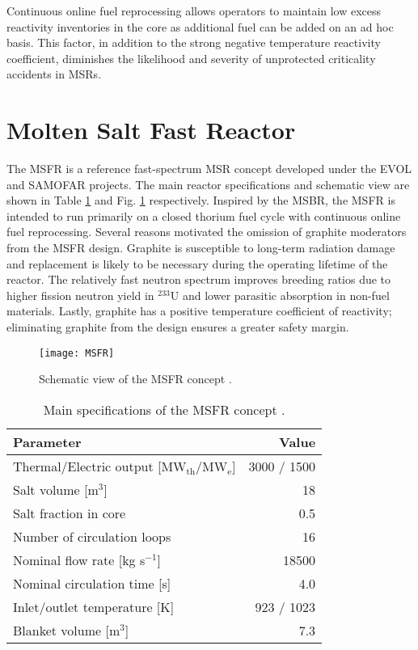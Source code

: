 Continuous online fuel reprocessing allows operators to maintain low excess
reactivity inventories in the core as additional fuel can be added on an ad
hoc basis. This factor, in addition to the strong negative temperature
reactivity coefficient, diminishes the likelihood and severity of unprotected
criticality accidents in \glspl{MSR}. 


\section{Molten Salt Fast Reactor}

The \gls{MSFR} is a reference fast-spectrum \gls{MSR} concept developed
under the \gls{EVOL} and \gls{SAMOFAR} projects. The main reactor
specifications and schematic view are shown in Table \ref{table:msfr} and Fig.
\ref{fig:msfr} respectively. Inspired by the \gls{MSBR}, the \gls{MSFR} is
intended to run primarily on a closed thorium fuel cycle with
continuous online fuel reprocessing. Several reasons motivated the omission of
graphite moderators from the \gls{MSFR} design. Graphite is susceptible to
long-term radiation damage and replacement is likely to be necessary during
the operating lifetime of the reactor. The relatively fast neutron spectrum
improves breeding ratios due to higher fission neutron yield in $^{233}$U and
lower parasitic absorption in non-fuel materials. Lastly, graphite has a
positive temperature coefficient of reactivity; eliminating graphite from the
design ensures a greater safety margin.
%
\begin{figure}[htb!] 
	\centering
	\texttt{[image: MSFR]}
	\caption{Schematic view of the MSFR concept \cite{serp_molten_2014}.}
	\label{fig:msfr}
\end{figure}
%
\begin{table}[htb!]
	\caption{Main specifications of the \gls{MSFR} concept
				\cite{serp_molten_2014}.}
	\centering
	\begin{tabular}{ l r }
		\hline
		Parameter & Value \\
		\hline
		Thermal/Electric output [MW$_{\text{th}}$/MW$_{\text{e}}$] & 3000 /
		1500 
		\\
		Salt volume [m$^3$] & 18 \\
		Salt fraction in core & 0.5 \\
		Number of circulation loops & 16 \\
		Nominal flow rate [kg s$^{-1}$] & 18500  \\
		Nominal circulation time [s] & 4.0 \\
		Inlet/outlet temperature [K] & 923 / 1023 \\
		Blanket volume [m$^3$] & 7.3\\
		\hline
	\end{tabular}
	\label{table:msfr}
\end{table}

